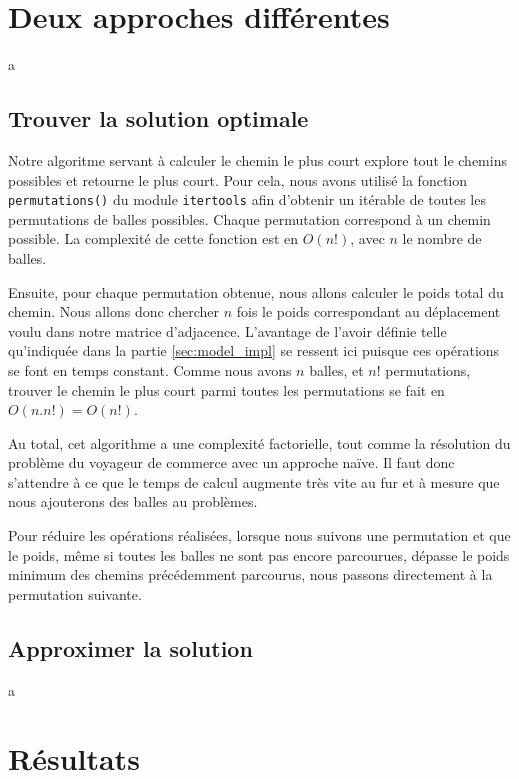 \documentclass[12pt]{article}
\begin{document}
    \section{Deux approches différentes}
    \label{sec:diff_approch}
    a

    \subsection{Trouver la solution optimale}
    \label{subsec:sol_opti}

    Notre algoritme servant à calculer le chemin le plus court explore tout le chemins possibles et retourne le plus court. Pour cela, nous avons utilisé la fonction \verb|permutations()| du module \verb|itertools| afin d'obtenir un itérable de toutes les permutations de balles possibles. Chaque permutation correspond à un chemin possible. La complexité de cette fonction est en $O(n!)$, avec $n$ le nombre de balles.

    Ensuite, pour chaque permutation obtenue, nous allons calculer le poids total du chemin. Nous allons donc chercher $n$ fois le poids correspondant au déplacement voulu dans notre matrice d'adjacence. L'avantage de l'avoir définie telle qu'indiquée dans la partie \ref{sec:model_impl} se ressent ici puisque ces opérations se font en temps constant. Comme nous avons $n$ balles, et $n!$ permutations, trouver le chemin le plus court parmi toutes les permutations se fait en $O(n.n!) = O(n!)$.

    Au total, cet algorithme a une complexité factorielle, tout comme la résolution du problème du voyageur de commerce avec un approche naïve. Il faut donc s'attendre à ce que le temps de calcul augmente très vite au fur et à mesure que nous ajouterons des balles au problèmes.

    Pour réduire les opérations réalisées, lorsque nous suivons une permutation et que le poids, même si toutes les balles ne sont pas encore parcourues, dépasse le poids minimum des chemins précédemment parcourus, nous passons directement à la permutation suivante.

    \subsection{Approximer la solution}
    \label{subsec:sol_approch}
    a

    \section{Résultats}
    \label{sec:result}
\end{document}
